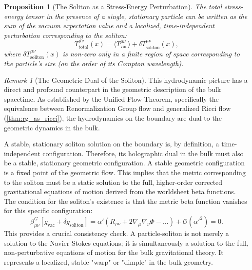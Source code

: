 \documentclass[11pt, letterpaper]{report}
\theoremstyle{plain} %
\newtheorem{proposition}[theorem]{Proposition}
\theoremstyle{definition} %
\theoremstyle{remark} %
\newtheorem{remark}{Remark}[chapter]
\begin{document}
\begin{proposition}[The Soliton as a Stress-Energy Perturbation]
\label{prop:soliton_stress_energy}
The total stress-energy tensor in the presence of a single, stationary particle can be written as the sum of the vacuum expectation value and a localized, time-independent perturbation corresponding to the soliton:
\begin{equation}
    T^{\mu\nu}_{\text{total}}(x) = \langle T^{\mu\nu}_{\text{vac}} \rangle + \delta T^{\mu\nu}_{\text{soliton}}(x),
\end{equation}
where $\delta T^{\mu\nu}_{\text{soliton}}(x)$ is non-zero only in a finite region of space corresponding to the particle's size (on the order of its Compton wavelength).
\end{proposition}

\begin{remark}[The Geometric Dual of the Soliton]
This hydrodynamic picture has a direct and profound counterpart in the geometric description of the bulk spacetime. As established by the Unified Flow Theorem, specifically the equivalence between Renormalization Group flow and generalized Ricci flow (\cref{thm:rg_as_ricci}), the hydrodynamics on the boundary are dual to the geometric dynamics in the bulk.

A stable, stationary soliton solution on the boundary is, by definition, a time-independent configuration. Therefore, its holographic dual in the bulk must also be a stable, stationary geometric configuration. A stable geometric configuration is a fixed point of the geometric flow. This implies that the metric corresponding to the soliton must be a static solution to the full, higher-order corrected gravitational equations of motion derived from the worldsheet beta functions. The condition for the soliton's existence is that the metric beta function vanishes for this specific configuration:
\begin{equation}
    \beta^G_{\mu\nu}[g_{\text{vac}} + \delta g_{\text{soliton}}] = \alpha' \left( R_{\mu\nu} + 2\nabla_\mu\nabla_\nu\Phi - \dots \right) + \mathcal{O}(\alpha'^2) = 0.
\end{equation}
This provides a crucial consistency check. A particle-soliton is not merely a solution to the Navier-Stokes equations; it is simultaneously a solution to the full, non-perturbative equations of motion for the bulk gravitational theory. It represents a localized, stable "warp" or "dimple" in the bulk geometry.
\end{remark}
\end{document}
